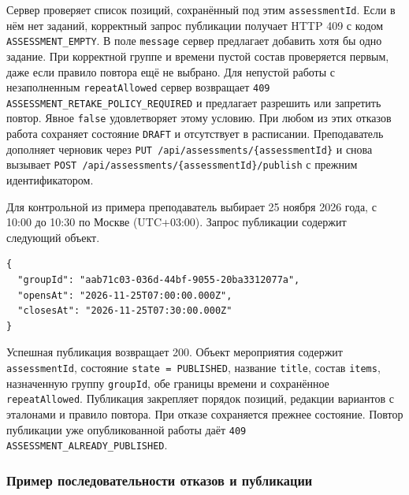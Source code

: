 \documentclass[12pt,a4paper]{article}
\begin{document}
Сервер проверяет список позиций, сохранённый под этим \texttt{assessment\allowbreak{}Id}. Если в нём нет заданий, корректный запрос публикации получает HTTP 409 с кодом \texttt{ASSESSMENT\_\allowbreak{}EMPTY}. В поле \texttt{message} сервер предлагает добавить хотя бы одно задание. При корректной группе и времени пустой состав проверяется первым, даже если правило повтора ещё не выбрано. Для непустой работы с незаполненным \texttt{repeat\allowbreak{}Allowed} сервер возвращает \texttt{409 ASSESSMENT\_\allowbreak{}RETAKE\_\allowbreak{}POLICY\_\allowbreak{}REQUIRED} и предлагает разрешить или запретить повтор. Явное \texttt{false} удовлетворяет этому условию. При любом из этих отказов работа сохраняет состояние \texttt{DRAFT} и отсутствует в расписании. Преподаватель дополняет черновик через \texttt{PUT /\allowbreak{}api/\allowbreak{}assessments/\allowbreak{}\{assessment\allowbreak{}Id\}} и снова вызывает \texttt{POST /\allowbreak{}api/\allowbreak{}assessments/\allowbreak{}\{assessment\allowbreak{}Id\}/\allowbreak{}publish} с прежним идентификатором.

Для контрольной из примера преподаватель выбирает 25 ноября 2026 года, с 10:00 до 10:30 по Москве (UTC+03:00). Запрос публикации содержит следующий объект.

\begin{verbatim}
{
  "groupId": "aab71c03-036d-44bf-9055-20ba3312077a",
  "opensAt": "2026-11-25T07:00:00.000Z",
  "closesAt": "2026-11-25T07:30:00.000Z"
}
\end{verbatim}

Успешная публикация возвращает 200. Объект мероприятия содержит \texttt{assessment\allowbreak{}Id}, состояние \texttt{state\ =\ PUBLISHED}, название \texttt{title}, состав \texttt{items}, назначенную группу \texttt{groupId}, обе границы времени и сохранённое \texttt{repeat\allowbreak{}Allowed}. Публикация закрепляет порядок позиций, редакции вариантов с эталонами и правило повтора. При отказе сохраняется прежнее состояние. Повтор публикации уже опубликованной работы даёт \texttt{409 ASSESSMENT\_\allowbreak{}ALREADY\_\allowbreak{}PUBLISHED}.

\subsubsection{Пример последовательности отказов и публикации}\label{ux43fux440ux438ux43cux435ux440-ux43fux43eux441ux43bux435ux434ux43eux432ux430ux442ux435ux43bux44cux43dux43eux441ux442ux438-ux43eux442ux43aux430ux437ux43eux432-ux438-ux43fux443ux431ux43bux438ux43aux430ux446ux438ux438}
\end{document}
